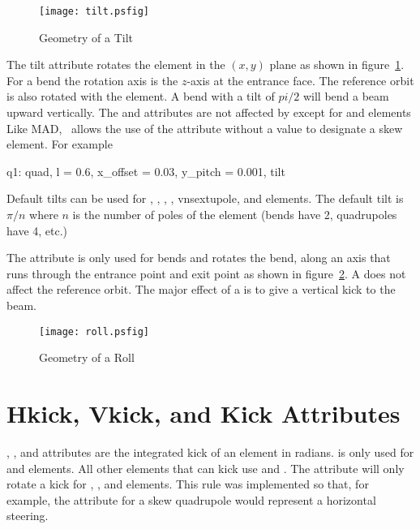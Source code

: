 \begin{figure}
  \centering
  \texttt{[image: tilt.psfig]}
  \caption{Geometry of a Tilt}
  \label{f:tilt}
\end{figure}

The tilt attribute rotates the element in the $(x, y)$ plane as
shown in figure~\ref{f:tilt}. For a bend the rotation axis is the
$z$-axis at the entrance face. The reference orbit is also rotated
with the element. A bend with a tilt of $pi/2$ will bend a beam
upward vertically. The  and  attributes are
not affected by  except for  and 
elements
Like MAD, \bmad\ allows the use of the  attribute without
a value to designate a skew element. For example
\begin{example}
  q1: quad, l = 0.6, x_offset = 0.03, y_pitch = 0.001, tilt
\end{example}
Default tilts can be used for , , ,
, vn{sextupole}, and  elements.
The default tilt is $\pi/n$ where $n$ is the number of poles of the
element (bends have 2, quadrupoles have 4, etc.) 


The  attribute is only used for bends
and rotates the bend, along an axis that runs through the entrance
point and exit point as shown in figure~\ref{f:roll}. A  
does not affect the reference orbit. The major effect of a 
is to give a vertical kick to the beam.
\begin{figure}
  \centering
  \texttt{[image: roll.psfig]}
  \caption{Geometry of a Roll}
  \label{f:roll}
\end{figure}


\section{Hkick, Vkick, and Kick Attributes}
\label{s:kick}

, , and  attributes are the integrated
kick of an element in radians.  is only used for 
and  elements. All other elements that can kick use 
 and . The  attribute will only rotate
a kick for , ,  and 
elements. This rule was implemented so that, for example, the 
 attribute for a skew quadrupole
would represent a horizontal steering.

